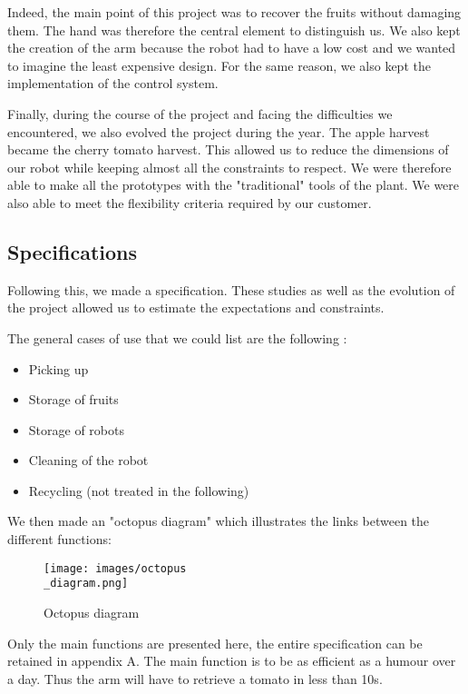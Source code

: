 \bigbreak

Indeed, the main point of this project was to recover the fruits without damaging them. The hand was therefore the central element to distinguish us. We also kept the creation of the arm because the robot had to have a low cost and we wanted to imagine the least expensive design. For the same reason, we also kept the implementation of the control system. 

\bigbreak

Finally, during the course of the project and facing the difficulties we encountered, we also evolved the project during the year. The apple harvest became the cherry tomato harvest. This allowed us to reduce the dimensions of our robot while keeping almost all the constraints to respect. We were therefore able to make all the prototypes with the "traditional" tools of the plant. We were also able to meet the flexibility criteria required by our customer. 

\subsection{Specifications}

\hspace{\parindent} Following this, we made a specification. These studies as well as the evolution of the project allowed us to estimate the expectations and constraints. 

\bigbreak

\noindent The general cases of use that we could list are the following : 
\begin{itemize}[noitemsep]
    \item Picking up
    \item Storage of fruits
    \item Storage of robots
    \item Cleaning of the robot
    \item Recycling (not treated in the following)
\end{itemize}


We then made an "octopus diagram" which illustrates the links between the different functions: 
\begin{figure}[ht]
    \centering
    \texttt{[image: images/octopus\\\_diagram.png]}
    \caption{Octopus diagram}
    \label{fig:mesh1}
\end{figure}

\bigbreak

Only the main functions are presented here, the entire specification can be retained in appendix A. The main function is to be as efficient as a humour over a day. Thus the arm will have to retrieve a tomato in less than 10s. 


